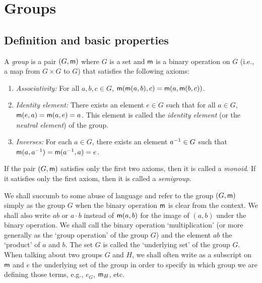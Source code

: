 \chapter{Groups}
\label{ch:groups}

\section{Definition and basic properties}
\label{sec:definition-and-basic-properties-grp}

\begin{definition}
    \label{def:group}
    A \emph{group} is a pair \((G, {\mathsf{m}})\) where \(G\) is a  set and \({\mathsf{m}}\)
    is a binary operation on \(G\) (i.e., a map from \(G \times G\) to \(G\))
    that satisfies the following axioms:
    \begin{enumerate}
        \item \emph{Associativity:} For all \(a, b, c \in G\), \({\mathsf{m}}({\mathsf{m}}(a,
        b), c) = {\mathsf{m}}(a, {\mathsf{m}}(b, c))\).
        \item \emph{Identity element:} There exists an element \(e \in G\) such
        that for all \(a \in G\), \({\mathsf{m}}(e, a) = {\mathsf{m}}(a, e) = a\). This
        element is called the \emph{identity element} (or the \emph{neutral
        element}) of the group.
        \item \emph{Inverses:} For each \(a \in G\), there exists an element
        \(a^{-1} \in G\) such that \({\mathsf{m}}(a, a^{-1}) = {\mathsf{m}}(a^{-1}, a) = e\).
    \end{enumerate}
\end{definition}

If the pair \((G, {\mathsf{m}})\) satisfies only the first two axioms, then it is
called a \emph{monoid}. If it satisfies only the first axiom, then it is called
a \emph{semigroup}.

We shall succumb to some abuse of language and refer to the group \((G, {\mathsf{m}})\)
simply as the group \(G\) when the binary operation \({\mathsf{m}}\) is clear from the
context. We shall also write \(ab\) or \(a \cdot b\) instead of \({\mathsf{m}}(a, b)\)
for the image of \((a, b)\) under the binary operation. We shall call the binary
operation `multiplication' (or more generally as the `group operation' of the
group \(G\)) and the element \(ab\) the `product' of \(a\) and \(b\). The set
\(G\) is called the `underlying set' of the group \(G\). When talking about two
groups \(G\) and \(H\), we shall often write as a subscript on \({\mathsf{m}}\) and
\(e\) the underlying set of the group in order to specify in which group we are
defining those terms, e.g., \(e_G\), \({\mathsf{m}}_H\), etc.

